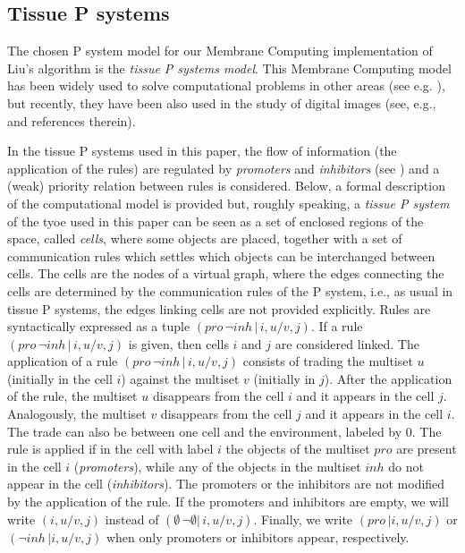 \documentclass[journal]{IEEEtran}
\begin{document}
\subsection{Tissue P systems}\label{def}
The chosen P system model for our Membrane Computing implementation
of Liu's algorithm is the {\it tissue P systems model}. This
Membrane Computing model has been widely used to solve computational
problems in other areas (see e.g.
\cite{DBLP:conf/iwinac/Diaz-PernilGPR09,Diaz-PernilGPR2010}), but
recently, they have been also used in the study of digital images
(see, e.g.,
\cite{Diaz-PernilGRS10,DBLP:conf/caip/Pena-CantillanaDBG11,DBLP:journals/ijncr/Pena-CantillanaDCG11}
and references therein).

In the tissue P systems used in this paper, the flow of information (the
application of the rules) are regulated by \emph{promoters} and
\emph{inhibitors} (see \cite{DBLP:journals/acta/BottoniMPR02}) and a
(weak) priority relation between rules is considered. Below, a formal description of the computational model is provided but, roughly speaking, a {\it tissue P system} of the tyoe used in this paper can be seen as a set of enclosed regions of the space, called {\it cells}, where some objects are placed, together with a set of communication rules which settles which objects can be interchanged between cells. The cells are the nodes of a virtual
graph, where the edges connecting the cells are determined by the communication
rules of the P system, i.e., as usual in tissue P systems, the edges linking
cells are not provided explicitly. Rules are syntactically expressed as a tuple $(pro\,\neg inh\,|\,i,u/v,j)$. If a rule $(pro\,\neg inh\,|\,i,u/v,j)$ is
given, then cells $i$ and $j$ are considered linked. The application of a rule
$(pro\,\neg inh\,|\,i,u/v,j)$ consists of trading the multiset $u$ (initially in
the cell $i$) against the multiset $v$ (initially in $j$). After the application
of the rule, the multiset $u$ disappears from the cell $i$ and it appears in the
cell $j$. Analogously, the multiset $v$ disappears from the cell $j$ and it
appears in the cell $i$. The trade can also be between one cell and the
environment, labeled by 0. The rule is applied if in the cell with label $i$ the
objects of the multiset $pro$ are present in the cell $i$ (\emph{promoters}),
while any of the objects in the multiset $inh$ do not appear in the cell
(\emph{inhibitors}). The promoters or the inhibitors are not modified by the
application of the rule. If the promoters and inhibitors are empty, we will
write $(i,u/v,j)$ instead of $(\emptyset\,\neg\emptyset|\,i,u/v,j)$. Finally, we
write $(pro\,|i,u/v,j)$ or $(\neg inh\,|i,u/v,j)$ when only promoters or
inhibitors appear, respectively.
\end{document}
